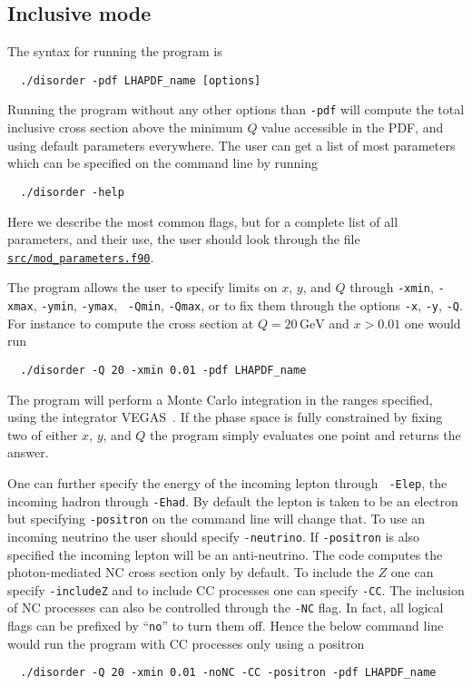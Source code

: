 \documentclass[submission, PhysCodeb]{SciPost_better_arXiv}
\newcommand{\GEV}{\,\mathrm{GeV}}
\newcommand{\ttt}[1]{\texttt{#1}}
\newcommand{\repolink}[2]{\href{https://github.com/alexanderkarlberg/disorder/blob/master/#1}{\ttt{#2}}}
\newcommand{\masterlink}[1]{\repolink{#1}{#1}}
\begin{document}
\subsection{Inclusive mode}
\label{sec:Inclusive}
The syntax for running the program is
\begin{lstlisting}
  ./disorder -pdf LHAPDF_name [options]
\end{lstlisting}
Running the program without any other options than {\tt -pdf} will
compute the total inclusive cross section above the minimum $Q$ value
accessible in the PDF, and using default parameters everywhere. The
user can get a list of most parameters which can be specified on the
command line by running
\begin{lstlisting}
  ./disorder -help
\end{lstlisting}
Here we describe the most common flags, but for a complete list of all
parameters, and their use, the user should look through the file
\masterlink{src/mod\_parameters.f90}.

The program allows the user to specify limits on $x$, $y$, and $Q$
through {\tt -xmin}, {\tt -xmax}, {\tt -ymin}, {\tt -ymax}, {\tt
  -Qmin}, {\tt -Qmax}, or to fix them through the options {\tt -x},
{\tt -y}, {\tt -Q}. For instance to compute the cross section at $Q=20
\GEV$ and $x>0.01$ one would run
\begin{lstlisting}
  ./disorder -Q 20 -xmin 0.01 -pdf LHAPDF_name
\end{lstlisting}
The program will perform a Monte Carlo integration in the ranges
specified, using the integrator VEGAS~\cite{Lepage:1977sw}. If the
phase space is fully constrained by fixing two of either $x$, $y$, and
$Q$ the program simply evaluates one point and returns the answer.

One can further specify the energy of the incoming lepton through {\tt
  -Elep}, the incoming hadron through {\tt -Ehad}. By default the
lepton is taken to be an electron but specifying {\tt -positron} on
the command line will change that. To use an incoming neutrino the
user should specify {\tt -neutrino}. If {\tt -positron} is also
specified the incoming lepton will be an anti-neutrino. The code
computes the photon-mediated NC cross section only by default. To
include the $Z$ one can specify {\tt -includeZ} and to include CC
processes one can specify {\tt -CC}. The inclusion of NC processes can
also be controlled through the {\tt -NC} flag. In fact, all logical
flags can be prefixed by ``{\tt{no}}'' to turn them off. Hence the
below command line would run the program with CC processes only using
a positron
\begin{lstlisting}
  ./disorder -Q 20 -xmin 0.01 -noNC -CC -positron -pdf LHAPDF_name
\end{lstlisting}
\end{document}
